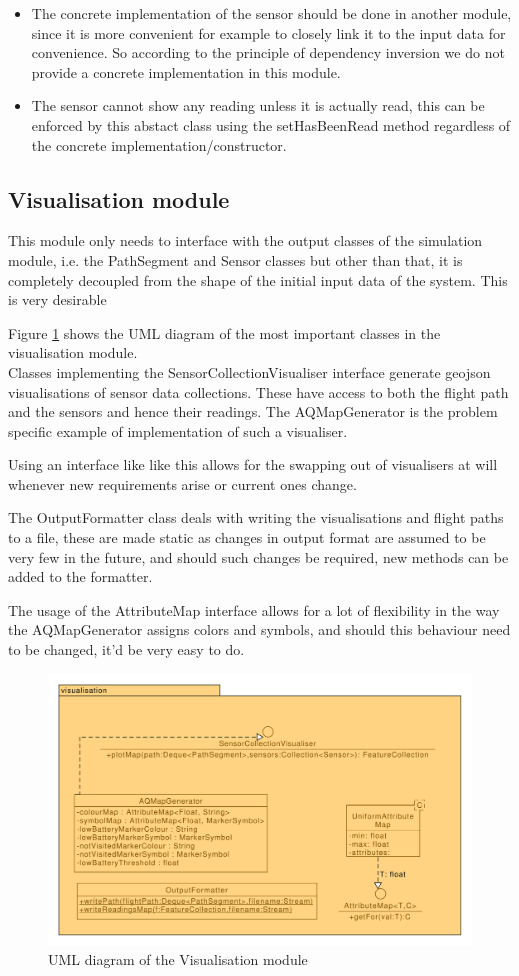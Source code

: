 \documentclass[10pt,a4paper]{article}
\begin{document}
\begin{itemize}
    \item The concrete implementation of the sensor should be done in another module, since it is more convenient for example to closely link it 
        to the input data for convenience. So according to the principle of dependency inversion we do not provide a concrete implementation in this module.
    \item The sensor cannot show any reading unless it is actually read, this can be enforced by this abstact class using the setHasBeenRead method regardless of the 
        concrete implementation/constructor.
\end{itemize}




\subsection{Visualisation module}
This module only needs to interface with the output classes of the simulation module, i.e. the PathSegment and Sensor classes but other than that, it is 
completely decoupled from the shape of the initial input data of the system. This is very desirable 
\par
Figure \ref{fig:visualisation} shows the UML diagram of the most important classes in the visualisation module.
\\
Classes implementing the SensorCollectionVisualiser interface generate geojson visualisations of sensor data collections.
These have access to both the flight path and the sensors and hence their readings. The AQMapGenerator is the problem specific example of implementation of such a visualiser.
\par
Using an interface like like this allows for the swapping out of visualisers at will whenever new requirements arise or current ones change.
\par 
The OutputFormatter class deals with writing the visualisations and flight paths to a file, these are made static as changes in output format are assumed to be very few in the future,
and should such changes be required, new methods can be added to the formatter.
\par 
The usage of the AttributeMap interface allows for a lot of flexibility in the way the AQMapGenerator assigns colors and symbols, and should this behaviour need to be changed, it'd be very easy to do.
\begin{figure}[H]
    \centering
    \includegraphics[width=0.7\columnwidth]{diagrams/visualisation.uxf.pdf}
    \caption{UML diagram of the Visualisation module}
    \label{fig:visualisation}
\end{figure}
\end{document}
